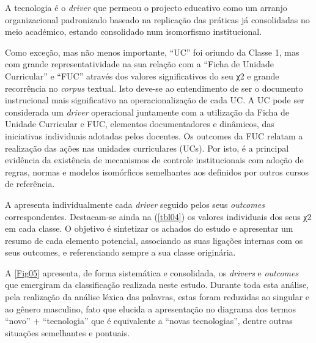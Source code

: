 \documentclass{textolivre-html}
\begin{document}
A tecnologia é o \textit{driver} que permeou o projecto educativo como um arranjo organizacional padronizado baseado na replicação das práticas já consolidadas no meio académico, estando consolidado num isomorfismo institucional.

Como exceção, mas não menos importante, “UC” foi oriundo da Classe 1, mas com grande representatividade na sua relação com a “Ficha de Unidade Curricular” e “FUC” através dos valores significativos do seu χ2 e grande recorrência no \textit{corpus} textual. Isto deve-se ao entendimento de ser o documento instrucional mais significativo na operacionalização de cada UC. A UC pode ser considerada um \textit{driver} operacional juntamente com a utilização da Ficha de Unidade Curricular e FUC, elementos documentadores e dinâmicos, das iniciativas individuais adotadas pelos docentes. Os outcomes da FUC relatam a realização das ações nas unidades curriculares (UCs). Por isto, é a principal evidência da existência de mecanismos de controle institucionais com adoção de regras, normas e modelos isomórficos semelhantes aos definidos por outros cursos de referência.



A  apresenta individualmente cada \textit{driver} seguido pelos seus \textit{outcomes} correspondentes. Destacam-se ainda na (\cref{tbl04}) os valores individuais dos seus χ2 em cada classe. O objetivo é sintetizar os achados do estudo e apresentar um resumo de cada elemento potencial, associando as suas ligações internas com os seus outcomes, e referenciando sempre a sua classe originária.

A \cref{Fig05} apresenta, de forma sistemática e consolidada, os \textit{drivers} e \textit{outcomes} que emergiram da classificação realizada neste estudo. Durante toda esta análise, pela realização da análise léxica das palavras, estas foram reduzidas ao singular e ao gênero masculino, fato que elucida a apresentação no diagrama dos termos “novo” + “tecnologia” que é equivalente a “novas tecnologias”, dentre outras situações semelhantes e pontuais.
\end{document}
